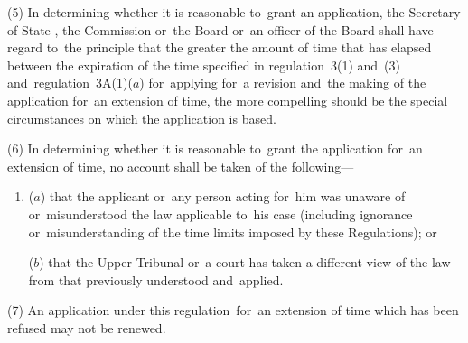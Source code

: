\documentclass[12pt,a4paper]{article}
\begin{document}
(5) In determining whether it is reasonable to~grant an application, the Secretary of State%
, the Commission
or~the Board or~an officer of the Board  %
shall have regard to~the principle that the greater the amount of time that has elapsed between the expiration of the time specified in regulation~3(1) and~(3) 
and~regulation~3A(1)($a$)  %
for~applying for~a revision and~the making of the application for~an extension of time, the more compelling should be the special circumstances on which the application is based.

(6) In determining whether it is reasonable to~grant the application for~an extension of time, no account shall be taken of the following—
\begin{enumerate}\item[]
($a$) that the applicant or~any person acting for~him was unaware of or~misunderstood the law applicable to~his case (including ignorance or~misunderstanding of the time limits imposed by these Regulations); or

($b$) that 
the Upper Tribunal  %
or~a court has taken a different view of the law from that previously understood and~applied.
\end{enumerate}

(7) An application under this regulation~for~an extension of time which has been refused may not be renewed.

\end{document}
